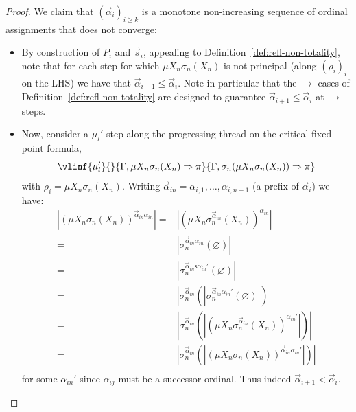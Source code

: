 \documentclass[10pt,a4paper]{amsart}
\theoremstyle{plain}
\theoremstyle{definition}
\renewcommand{\emptyset}{\varnothing}
\theoremstyle{plain}
\theoremstyle{definition} %
\renewcommand{\succ}{\mathsf s}
\newcommand{\arrow}{\to}
\newcommand{\seqar}{\Rightarrow}
\newcommand{\mulunf}{\lr \mu'}
\newcommand{\lr}[1]{#1_l}
\newcommand{\der}{P}
\newcommand{\hr}[1]{|#1|}
\begin{document}
\begin{proof}
We claim that $(\vec \alpha_i)_{i\geq k}$ is a monotone non-increasing sequence of ordinal assignments that does not converge:
\begin{itemize}
    \item By construction of $\der_i$ and $\vec s_i$, appealing to Definition~\ref{def:refl-non-totality}, note that for each step for which $\mu X_n\sigma_n(X_n)$ is not principal (along $(\rho_i)_i$ on the LHS) we have that $\vec \alpha_{i+1}\leq \vec \alpha_i$.
    Note in particular that the $\arrow$-cases of Definition~\ref{def:refl-non-totality} are designed to guarantee $\vec \alpha_{i+1}\leq \vec \alpha_i$ at $\arrow$-steps.
    \item Now, consider a $\mulunf$-step along the progressing thread on the critical fixed point formula,
    \[
    \vlinf{\mulunf}{}{\Gamma, \mu X_n \sigma_n(X_n)\seqar \pi}{\Gamma , \sigma_n(\mu X_n \sigma_n(X_n))\seqar \pi}
    \]
    with $\rho_i = \mu X_n \sigma_n (X_n)$.
    Writing $\vec \alpha_{in} = \alpha_{i,1}, \dots, \alpha_{i,n-1}$ (a prefix of $\vec \alpha_i$) we have:
    \[
    \begin{array}{rl}
        \hr{(\mu X_n \sigma_n (X_n))^{\vec \alpha_{in}\alpha_{in}}} 
        = & \hr{(\mu X_n \sigma_n^{\vec \alpha_{in}} (X_n))^{\alpha_{in}}} \\
        = & \hr{\sigma_n^{\vec \alpha_{in} \alpha_{in}}(\emptyset)} \\
        = & \hr{\sigma_n^{\vec \alpha_{in} \succ \alpha_{in}'}(\emptyset)} \\
        = & \hr{\sigma_n^{\vec \alpha_{in}} (\hr{\sigma_n^{\vec \alpha_{in} \alpha_{in}' } (\emptyset) } ) } \\
         = & \hr{\sigma_n^{\vec \alpha_{in}} (\hr{(\mu X_n \sigma_n^{\vec \alpha_{in}} (X_n))^{\alpha_{in}'}} ) } \\
           = & \hr{\sigma_n^{\vec \alpha_{in}} ( \hr{(\mu X_n \sigma_n(X_n))^{\vec \alpha_{in}\alpha_{in}'}}) } \\
    \end{array}
    \]
    for some $\alpha_{in}'$ since $\alpha_{ij}$ must be a successor ordinal.
    Thus indeed $\vec \alpha_{i+1} < \vec \alpha_{i}$.
\end{itemize}
% 

\end{proof}
\end{document}
